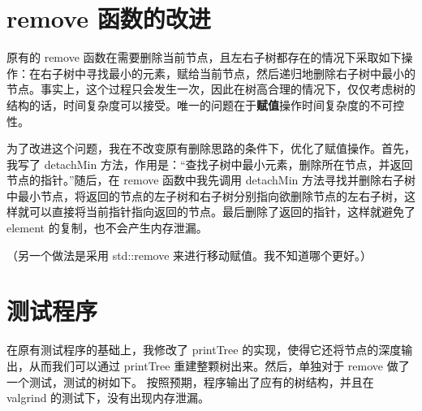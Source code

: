 \documentclass[UTF8]{ctexart}
\begin{document}
\pagestyle{fancy}
\fancyhead{}

\section{remove 函数的改进}
原有的 remove 函数在需要删除当前节点，且左右子树都存在的情况下采取如下操作：在右子树中寻找最小的元素，赋给当前节点，然后递归地删除右子树中最小的节点。事实上，这个过程只会发生一次，因此在树高合理的情况下，仅仅考虑树的结构的话，时间复杂度可以接受。唯一的问题在于\textbf{赋值}操作时间复杂度的不可控性。

为了改进这个问题，我在不改变原有删除思路的条件下，优化了赋值操作。首先，我写了 detachMin 方法，作用是：“查找子树中最小元素，删除所在节点，并返回节点的指针。”随后，在 remove 函数中我先调用 detachMin 方法寻找并删除右子树中最小节点，将返回的节点的左子树和右子树分别指向欲删除节点的左右子树，这样就可以直接将当前指针指向返回的节点。最后删除了返回的指针，这样就避免了 element 的复制，也不会产生内存泄漏。

（另一个做法是采用 std::remove 来进行移动赋值。我不知道哪个更好。）

\section{测试程序}
在原有测试程序的基础上，我修改了 printTree 的实现，使得它还将节点的深度输出，从而我们可以通过 printTree 重建整颗树出来。然后，单独对于 remove 做了一个测试，测试的树如下。
按照预期，程序输出了应有的树结构，并且在 valgrind 的测试下，没有出现内存泄漏。
\end{document}

